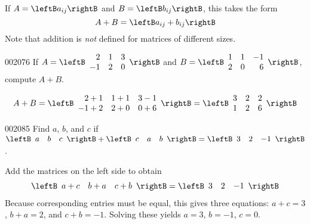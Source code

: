 \noindent If $A = \leftB a_{ij} \rightB$ and $B = \leftB b_{ij} \rightB$, this takes the form
\begin{equation*}
A + B = \leftB a_{ij} + b_{ij} \rightB
\end{equation*}
Note that addition is \textit{not} defined for matrices of different sizes.


\begin{example}{}{002076}
If $A = \leftB \begin{array}{rrr}
2 & 1 & 3 \\
-1 & 2 & 0
\end{array} \rightB$
 and $B = \leftB \begin{array}{rrr}
 1 & 1 & -1 \\
 2 & 0 & 6
 \end{array} \rightB$,
 compute $A + B$.

\begin{solution}
\begin{equation*}
A + B = \leftB \begin{array}{rrr}
2 + 1 & 1 + 1 & 3 - 1 \\
-1 + 2 & 2 + 0 & 0 + 6
\end{array} \rightB
=
\leftB \begin{array}{rrr}
3 & 2 & 2 \\
1 & 2 & 6
\end{array} \rightB
\end{equation*}
\end{solution}
\end{example}

\begin{example}{}{002085}
Find $a$, $b$, and $c$ if $\leftB \begin{array}{ccc}
a & b & c
\end{array} \rightB + \leftB 
\begin{array}{ccc}
c & a & b
\end{array} \rightB 
= \leftB \begin{array}{ccc}
3 & 2 & -1
\end{array} \rightB$.


\begin{solution}
  Add the matrices on the left side to obtain
\begin{equation*}
\leftB \begin{array}{ccc}
a + c & b + a & c + b
\end{array} \rightB
=
\leftB \begin{array}{rrr}
3 & 2 & -1
\end{array} \rightB
\end{equation*}
Because corresponding entries must be equal, this gives three equations: $a + c = 3$, $b + a = 2$, and $c + b = -1$. Solving these yields $a = 3$, $b = -1$, $c = 0$.
\end{solution}
\end{example}

